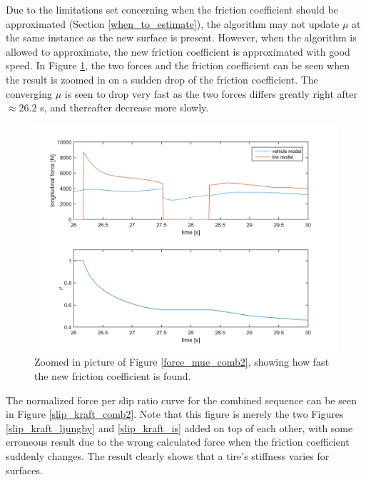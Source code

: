 Due to the limitations set concerning when the friction coefficient should be approximated (Section \ref{when_to_estimate}), the algorithm may not update $ \mu $ at the same instance as the new surface is present. However, when the algorithm is allowed to approximate, the new friction coefficient is approximated with good speed. In Figure \ref{force_mue_comb2_zoom}, the two forces and the friction coefficient can be seen when the result is zoomed in on a sudden drop of the friction coefficient. The converging $ \mu $ is seen to drop very fast as the two forces differs greatly right after $ \approx 26.2 $ s, and thereafter decrease more slowly. 

\begin{figure}[h]
	\centering
	\includegraphics[width=1.0\textwidth]{Pictures/force_mue_comb2_zoom}
	\caption {Zoomed in picture of Figure \ref{force_mue_comb2}, showing how fast the new friction coefficient is found.}
	\label{force_mue_comb2_zoom}
\end{figure}

The normalized force per slip ratio curve for the combined sequence can be seen in Figure \ref{slip_kraft_comb2}. Note that this figure is merely the two Figures \ref{slip_kraft_ljungby} and \ref{slip_kraft_is} added on top of each other, with some erroneous result due to the wrong calculated force when the friction coefficient suddenly changes. The result clearly shows that a tire's stiffness varies for surfaces.

